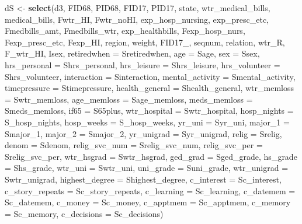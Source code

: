 \documentclass[]{article}
\newenvironment{Shaded}{\begin{snugshade}}{\end{snugshade}}
\newcommand{\DataTypeTok}[1]{\textcolor[rgb]{0.13,0.29,0.53}{#1}}
\newcommand{\DecValTok}[1]{\textcolor[rgb]{0.00,0.00,0.81}{#1}}
\newcommand{\KeywordTok}[1]{\textcolor[rgb]{0.13,0.29,0.53}{\textbf{#1}}}
\newcommand{\NormalTok}[1]{#1}
\newcommand{\StringTok}[1]{\textcolor[rgb]{0.31,0.60,0.02}{#1}}
\begin{document}
\begin{Shaded}
\begin{Highlighting}[]
\NormalTok{dS <-}\StringTok{ }\KeywordTok{select}\NormalTok{(d3, FID68, PID68, FID17, PID17, state, wtr_medical_bills, medical_bills, Fwtr_HI, Fwtr_noHI, exp_hosp_nursing, exp_presc_etc, Fmedbills_amt, Fmedbills_wtr, exp_healthbills, Fexp_hosp_nurs, Fexp_presc_etc, Fexp_HI, region, weight, FID17_, seqnum, relation, wtr_R, F_wtr_HI, Isex, }
             \DataTypeTok{retiredwhen =}\NormalTok{ Sretiredwhen,}
             \DataTypeTok{age =}\NormalTok{ Sage, }
             \DataTypeTok{sex =}\NormalTok{ Ssex, }
             \DataTypeTok{hrs_personal =}\NormalTok{ Shrs_personal, }
             \DataTypeTok{hrs_leisure =}\NormalTok{ Shrs_leisure, }
             \DataTypeTok{hrs_volunteer =}\NormalTok{ Shrs_volunteer, }
             \DataTypeTok{interaction =}\NormalTok{ Sinteraction, }
             \DataTypeTok{mental_activity =}\NormalTok{ Smental_activity, }
             \DataTypeTok{timepressure =}\NormalTok{ Stimepressure, }
             \DataTypeTok{health_general =}\NormalTok{ Shealth_general, }
             \DataTypeTok{wtr_memloss =}\NormalTok{ Swtr_memloss, }
             \DataTypeTok{age_memloss =}\NormalTok{ Sage_memloss, }
             \DataTypeTok{meds_memloss =}\NormalTok{ Smeds_memloss, }
             \DataTypeTok{if65 =}\NormalTok{ S65plus, }
             \DataTypeTok{wtr_hospital =}\NormalTok{ Swtr_hospital, }
             \DataTypeTok{hosp_nights =}\NormalTok{ S_hosp_nights, }
             \DataTypeTok{hosp_weeks =}\NormalTok{ S_hosp_weeks, }
             \DataTypeTok{yr_uni =}\NormalTok{ Syr_uni, }
             \DataTypeTok{major_1 =}\NormalTok{ Smajor_}\DecValTok{1}\NormalTok{, }
             \DataTypeTok{major_2 =}\NormalTok{ Smajor_}\DecValTok{2}\NormalTok{, }
             \DataTypeTok{yr_unigrad =}\NormalTok{ Syr_unigrad, }
             \DataTypeTok{relig =}\NormalTok{ Srelig, }
             \DataTypeTok{denom =}\NormalTok{ Sdenom, }
             \DataTypeTok{relig_svc_num =}\NormalTok{ Srelig_svc_num, }
             \DataTypeTok{relig_svc_per =}\NormalTok{ Srelig_svc_per,}
             \DataTypeTok{wtr_hsgrad =}\NormalTok{ Swtr_hsgrad, }
             \DataTypeTok{ged_grad =}\NormalTok{ Sged_grade, }
             \DataTypeTok{hs_grade =}\NormalTok{ Shs_grade, }
             \DataTypeTok{wtr_uni =}\NormalTok{ Swtr_uni, }
             \DataTypeTok{uni_grade =}\NormalTok{ Suni_grade, }
             \DataTypeTok{wtr_unigrad =}\NormalTok{ Swtr_unigrad, }
             \DataTypeTok{highest_degree =}\NormalTok{ Shighest_degree,}
             \DataTypeTok{c_interest =}\NormalTok{ Sc_interest, }
             \DataTypeTok{c_story_repeats =}\NormalTok{ Sc_story_repeats, }
             \DataTypeTok{c_learning =}\NormalTok{ Sc_learning, }
             \DataTypeTok{c_datemem =}\NormalTok{ Sc_datemem, }
             \DataTypeTok{c_money =}\NormalTok{ Sc_money, }
             \DataTypeTok{c_apptmem =}\NormalTok{ Sc_apptmem, }
             \DataTypeTok{c_memory =}\NormalTok{ Sc_memory, }
             \DataTypeTok{c_decisions =}\NormalTok{ Sc_decisions)}



\end{Highlighting}
\end{Shaded}
\end{document}
